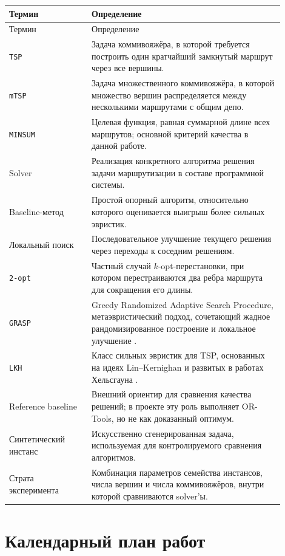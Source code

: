 \documentclass[a4paper,12pt]{article}
\begin{document}
\begin{longtable}{L{0.27\linewidth}L{0.63\linewidth}}
\toprule
Термин & Определение \\
\midrule
\endfirsthead
\toprule
Термин & Определение \\
\midrule
\endhead
\texttt{TSP} & Задача коммивояжёра, в которой требуется построить один кратчайший замкнутый маршрут через все вершины. \\
\texttt{mTSP} & Задача множественного коммивояжёра, в которой множество вершин распределяется между несколькими маршрутами с общим депо. \\
\texttt{MINSUM} & Целевая функция, равная суммарной длине всех маршрутов; основной критерий качества в данной работе. \\
Solver & Реализация конкретного алгоритма решения задачи маршрутизации в составе программной системы. \\
Baseline-метод & Простой опорный алгоритм, относительно которого оценивается выигрыш более сильных эвристик. \\
Локальный поиск & Последовательное улучшение текущего решения через переходы к соседним решениям. \\
\texttt{2-opt} & Частный случай \(k\)-opt-перестановки, при котором перестраиваются два ребра маршрута для сокращения его длины. \\
\texttt{GRASP} & Greedy Randomized Adaptive Search Procedure, метаэвристический подход, сочетающий жадное рандомизированное построение и локальное улучшение \cite{feo1995}. \\
\texttt{LKH} & Класс сильных эвристик для TSP, основанных на идеях Lin--Kernighan и развитых в работах Хельсгауна \cite{lin1973,helsgaun2000}. \\
Reference baseline & Внешний ориентир для сравнения качества решений; в проекте эту роль выполняет OR-Tools, но не как доказанный оптимум. \\
Синтетический инстанс & Искусственно сгенерированная задача, используемая для контролируемого сравнения алгоритмов. \\
Страта эксперимента & Комбинация параметров семейства инстансов, числа вершин и числа коммивояжёров, внутри которой сравниваются solver'ы. \\
\bottomrule
\end{longtable}

\section{Календарный план работ}
\end{document}
